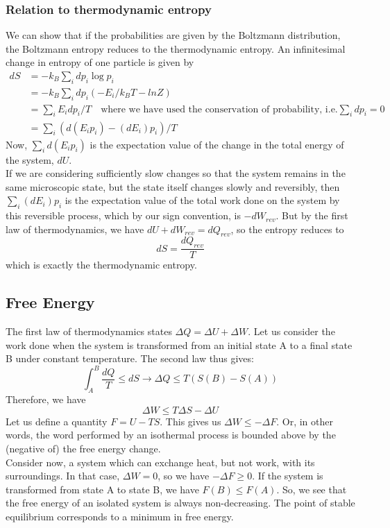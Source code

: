\documentclass[letterpaper,10pt,english]{article}
\begin{document}
\subsubsection{Relation to thermodynamic entropy} 
We can show that if the probabilities are given by the Boltzmann distribution, the Boltzmann entropy reduces to the thermodynamic entropy. An infinitesimal change in entropy of one particle is given by 
\begin{align*}
dS&=-k_B \sum_i{dp_i \log p_i} \\
&=-k_B \sum_i{dp_i(-E_i/k_B T-ln Z)} \\
&=\sum_i {E_i dp_i/T} \quad \text{where we have used the conservation of probability, i.e.} \sum_i {dp_i=0} \\
&=\sum_i {\left( d(E_i p_i)-(dE_i)p_i\right)/T}
\end{align*}
Now, $\sum_i { d(E_i p_i)}$ is the expectation value of the change in the total energy of the system, $dU$. \\
If we are considering sufficiently slow changes so that the system remains in the same microscopic state, but the state itself changes slowly and reversibly, then  $\sum_i { (dE_i) p_i}$ is the expectation value of the total work done on the system by this reversible process, which by our sign convention, is $-dW_{rev}$. But by the first law of thermodynamics, we have $dU+dW_{rev}=dQ_{rev}$, so the entropy reduces to 
\begin{equation*}
dS=\frac{dQ_{rev}}{T}
\end{equation*}
which is exactly the thermodynamic entropy. 
\subsection{Free Energy}
The first law of thermodynamics states $\Delta Q=\Delta U+\Delta W$. Let us consider the work done when the system is transformed from an initial state A to a final state B under constant temperature. The second law thus gives:
\begin{equation*}
\int_A^B \frac{dQ}{T} \leq dS \rightarrow \Delta Q \leq T \left( S(B)-S(A) \right)
\end{equation*}
Therefore, we have 
\begin{equation*}
\Delta W \leq T\Delta S-\Delta U
\end{equation*}
Let us define a quantity $F=U-TS$. This gives us $\Delta W \leq -\Delta F$. Or, in other words, the word performed by an isothermal process is bounded above by the (negative of) the free energy change. \\
Consider now, a system which can exchange heat, but not work, with its surroundings. In that case, $\Delta W=0$, so we have $-\Delta F \geq 0$. If the system is transformed from state A to state B, we have $F(B) \leq F(A)$. So, we see that the free energy of an isolated system is always non-decreasing. The point of stable equilibrium corresponds to a minimum in free energy. 
\end{document}

